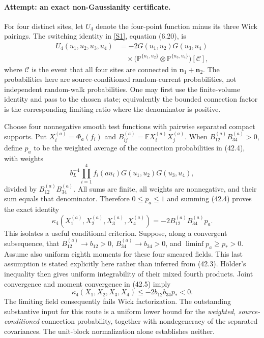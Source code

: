 \documentclass[11pt,a4paper]{article}
\newcommand{\E}{\mathbb{E}}
\newcommand{\sref}[2]{\hyperlink{source:#1:#2}{[S#2]}}
\numberwithin{equation}{section}
\begin{document}
\paragraph{Attempt: an exact non-Gaussianity certificate.}
For four distinct sites, let $U_4$ denote the four-point function minus its
three Wick pairings. The switching identity in \sref{30006692}{1}, equation
(6.20), is
\[
 \begin{aligned}
 U_4(u_1,u_2,u_3,u_4)
 &=-2G(u_1,u_2)G(u_3,u_4)\\
 &\quad\times
 \bigl(\mathbb P^{\{u_1,u_2\}}\!\otimes
   \mathbb P^{\{u_3,u_4\}}\bigr)[\mathcal C],
 \end{aligned}
 \tag{42.4}
\]
where $\mathcal C$ is the event that all four sites are connected in
$\mathbf n_1+\mathbf n_2$. The probabilities here are source-conditioned random-current probabilities,
not independent random-walk probabilities. One may first use the finite-volume
identity and pass to the chosen state; equivalently the bounded connection
factor is the corresponding limiting ratio where the denominator is positive.

Choose four nonnegative smooth test functions with pairwise separated
compact supports. Put $X_i^{(a)}=\Phi_a(f_i)$ and
$B_{ij}^{(a)}=\E X_i^{(a)}X_j^{(a)}$. When
$B_{12}^{(a)}B_{34}^{(a)}>0$, define $p_a$ to be the weighted average of the
connection probabilities in (42.4), with weights
\[
 b_L^{-4}\prod_{i=1}^4 f_i(au_i)G(u_1,u_2)G(u_3,u_4),
\]
divided by $B_{12}^{(a)}B_{34}^{(a)}$. All sums are finite, all weights are
nonnegative, and their sum equals that denominator. Therefore $0\le p_a\le1$
and summing (42.4) proves the exact identity
\[
 \kappa_4(X_1^{(a)},X_2^{(a)},X_3^{(a)},X_4^{(a)})
       =-2B_{12}^{(a)}B_{34}^{(a)}p_a. \tag{42.5}
\]
This isolates a useful conditional criterion. Suppose, along a convergent
subsequence, that $B_{12}^{(a)}\to b_{12}>0$,
$B_{34}^{(a)}\to b_{34}>0$, and $\liminf p_a\ge p_*>0$.
Assume also uniform eighth moments for these four smeared fields. This last
assumption is stated explicitly here rather than inferred from (42.3).
H\"older's inequality then gives uniform integrability of their mixed
fourth products. Joint convergence and moment convergence in (42.5) imply
\[
 \kappa_4(X_1,X_2,X_3,X_4)\le-2b_{12}b_{34}p_*<0.
 \tag{42.6}
\]
The limiting field consequently fails Wick factorization. The outstanding
substantive input for this route is a uniform lower bound for the
\emph{weighted, source-conditioned} connection probability, together with
nondegeneracy of the separated covariances. The unit-block normalization
alone establishes neither.
\end{document}
